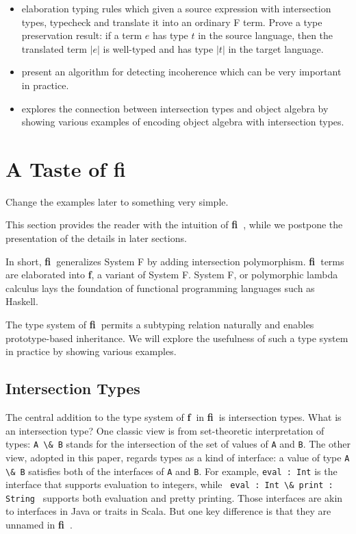 \documentclass[preprint]{sigplanconf}
\newcommand{\name}{{\bf fi~}}
\newcommand{\target}{{\bf f~}}
\newcommand{\Target}{{\bf f}}
\begin{document}
\begin{itemize}

\item{elaboration typing rules which given a source expression with intersection
    types, typecheck and translate it into an ordinary F term. Prove a type
    preservation result: if a term $e$ has type $t$ in the source language,
    then the translated term $|e|$ is well-typed and has type $|t|$ in the
    target language.}

\item{present an algorithm for detecting incoherence which can be very important
    in practice.}

\item{explores the connection between intersection types and object algebra by
    showing various examples of encoding object algebra with intersection
    types.}

\end{itemize}
\section{A Taste of fi}

\begin{footnote}
  Change the examples later to something very simple.
\end{footnote}

This section provides the reader with the intuition of \name, while we postpone
the presentation of the details in later sections.

In short, \name generalizes System F by adding intersection polymorphism. \name terms
are elaborated into \Target, a variant of System F. System F, or polymorphic
lambda calculus lays the foundation of functional programming languages such as
Haskell.

The type system of \name permits a subtyping relation naturally and enables
prototype-based inheritance. We will explore the usefulness of such a type
system in practice by showing various examples.

\subsection{Intersection Types}

The central addition to the type system of \target in \name is intersection types. What
is an intersection type? One classic view is from set-theoretic interpretation
of types: \lstinline{A \& B} stands for the intersection of the set of values of
\lstinline{A} and \lstinline{B}. The other view, adopted in this paper, regards
types as a kind of interface: a value of type \lstinline{A \& B} satisfies both
of the interfaces of \lstinline{A} and \lstinline{B}. For example,
\lstinline{eval : Int} is the interface that supports evaluation to integers,
while \lstinline{ eval : Int \& print : String } supports both evaluation and
pretty printing. Those interfaces are akin to interfaces in Java or traits in
Scala. But one key difference is that they are unnamed in \name.
\end{document}
